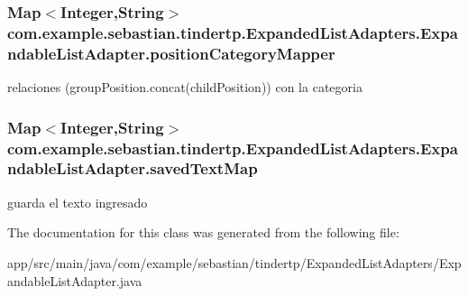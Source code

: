 \subsubsection[{\texorpdfstring{position\+Category\+Mapper}{positionCategoryMapper}}]{\setlength{\rightskip}{0pt plus 5cm}Map$<$Integer,String$>$ com.\+example.\+sebastian.\+tindertp.\+Expanded\+List\+Adapters.\+Expandable\+List\+Adapter.\+position\+Category\+Mapper\hspace{0.3cm}{\ttfamily [private]}}\hypertarget{classcom_1_1example_1_1sebastian_1_1tindertp_1_1ExpandedListAdapters_1_1ExpandableListAdapter_a9cb34b25c6cc8aa0fe20f1bfebbd3635}{}\label{classcom_1_1example_1_1sebastian_1_1tindertp_1_1ExpandedListAdapters_1_1ExpandableListAdapter_a9cb34b25c6cc8aa0fe20f1bfebbd3635}
relaciones (group\+Position.\+concat(child\+Position)) con la categoria 
\subsubsection[{\texorpdfstring{saved\+Text\+Map}{savedTextMap}}]{\setlength{\rightskip}{0pt plus 5cm}Map$<$Integer,String$>$ com.\+example.\+sebastian.\+tindertp.\+Expanded\+List\+Adapters.\+Expandable\+List\+Adapter.\+saved\+Text\+Map\hspace{0.3cm}{\ttfamily [private]}}\hypertarget{classcom_1_1example_1_1sebastian_1_1tindertp_1_1ExpandedListAdapters_1_1ExpandableListAdapter_a77dfc0cc5b6b6200eb43064adf7da1da}{}\label{classcom_1_1example_1_1sebastian_1_1tindertp_1_1ExpandedListAdapters_1_1ExpandableListAdapter_a77dfc0cc5b6b6200eb43064adf7da1da}
guarda el texto ingresado 

The documentation for this class was generated from the following file\+:\begin{DoxyCompactItemize}
\item 
app/src/main/java/com/example/sebastian/tindertp/\+Expanded\+List\+Adapters/Expandable\+List\+Adapter.\+java\end{DoxyCompactItemize}
